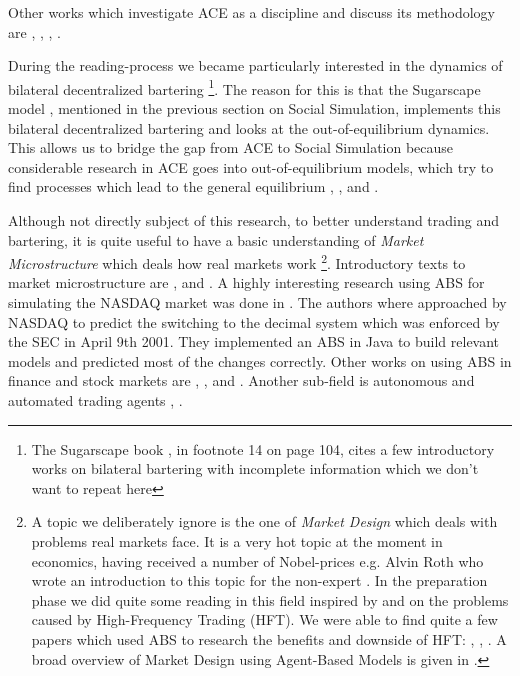 Other works which investigate ACE as a discipline and discuss its methodology are \cite{tesfatsion_agent-based_2002}, \cite{richiardi_agent-based_2007}, \cite{ballot_agent-based_2015}, \cite{blume_introduction_2015}.

During the reading-process we became particularly interested in the dynamics of bilateral decentralized bartering \footnote{The Sugarscape book \cite{epstein_growing_1996}, in footnote 14 on page 104, cites a few introductory works on bilateral bartering with incomplete information which we don't want to repeat here}. The reason for this is that the Sugarscape model \cite{epstein_growing_1996}, mentioned in the previous section on Social Simulation, implements this bilateral decentralized bartering and looks at the out-of-equilibrium dynamics. This allows us to bridge the gap from ACE to Social Simulation because considerable research in ACE goes into out-of-equilibrium models, which try to find processes which lead to the general equilibrium \cite{gintis_emergence_2006}, \cite{gintis_dynamics_2007}, \cite{arthur_out--equilibrium_2006} and \cite{botta_functional_2011}. %

Although not directly subject of this research, to better understand trading and bartering, it is quite useful to have a basic understanding of \textit{Market Microstructure} which deals how real markets work \footnote{A topic we deliberately ignore is the one of \textit{Market Design} which deals with problems real markets face. It is a very hot topic at the moment in economics, having received a number of Nobel-prices e.g. Alvin Roth who wrote an introduction to this topic for the non-expert \cite{roth_who_2015}. In the preparation phase we did quite some reading in this field inspired by \cite{sornette_crashes_2011} and \cite{budish_editors_2015} on the problems caused by High-Frequency Trading (HFT). We were able to find quite a few papers which used ABS to research the benefits and downside of HFT: \cite{wah_latency_2013}, \cite{leal_rock_2016}, \cite{yim_effect_2015}. A broad overview of Market Design using Agent-Based Models is given in \cite{marks_chapter_2006}.}. Introductory texts to market microstructure are \cite{harris_trading_2003}, \cite{baker_market_2013} and \cite{lehalle_market_2013}. A highly interesting research using ABS for simulating the NASDAQ market was done in \cite{darley_nasdaq_2007}. The authors where approached by NASDAQ to predict the switching to the decimal system which was enforced by the SEC in April 9th 2001. They implemented an ABS in Java to build relevant models and predicted most of the changes correctly. Other works on using ABS in finance and stock markets are \cite{lebaron_agent-based_2000}, \cite{lebaron_building_2002}, \cite{streltchenko_multi-agent_2005} and \cite{panayi_agent-based_2012}. Another sub-field is autonomous and automated trading agents \cite{mackie-mason_chapter_2006}, \cite{toulis_mertacor:_2006}.

